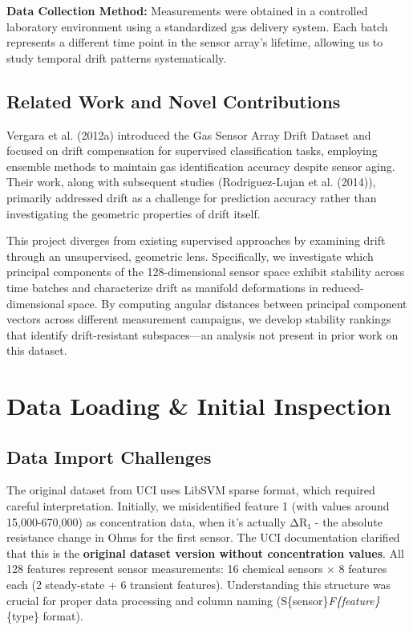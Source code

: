\documentclass[
  letterpaper,
  DIV=11,
  numbers=noendperiod]{scrartcl}
\begin{document}
\textbf{Data Collection Method:} Measurements were obtained in a
controlled laboratory environment using a standardized gas delivery
system. Each batch represents a different time point in the sensor
array's lifetime, allowing us to study temporal drift patterns
systematically.

\subsection{Related Work and Novel
Contributions}\label{related-work-and-novel-contributions}

Vergara et al. (2012a) introduced the Gas Sensor Array Drift Dataset and
focused on drift compensation for supervised classification tasks,
employing ensemble methods to maintain gas identification accuracy
despite sensor aging. Their work, along with subsequent studies
(Rodriguez-Lujan et al. (2014)), primarily addressed drift as a
challenge for prediction accuracy rather than investigating the
geometric properties of drift itself.

This project diverges from existing supervised approaches by examining
drift through an unsupervised, geometric lens. Specifically, we
investigate which principal components of the 128-dimensional sensor
space exhibit stability across time batches and characterize drift as
manifold deformations in reduced-dimensional space. By computing angular
distances between principal component vectors across different
measurement campaigns, we develop stability rankings that identify
drift-resistant subspaces---an analysis not present in prior work on
this dataset.

\section{Data Loading \& Initial
Inspection}\label{data-loading-initial-inspection}

\subsection{Data Import Challenges}\label{data-import-challenges}

The original dataset from UCI uses LibSVM sparse format, which required
careful interpretation. Initially, we misidentified feature 1 (with
values around 15,000-670,000) as concentration data, when it's actually
ΔR₁ - the absolute resistance change in Ohms for the first sensor. The
UCI documentation clarified that this is the \textbf{original dataset
version without concentration values}. All 128 features represent sensor
measurements: 16 chemical sensors × 8 features each (2 steady-state + 6
transient features). Understanding this structure was crucial for proper
data processing and column naming
(S\{sensor\}\emph{F\{feature\}}\{type\} format).
\end{document}
